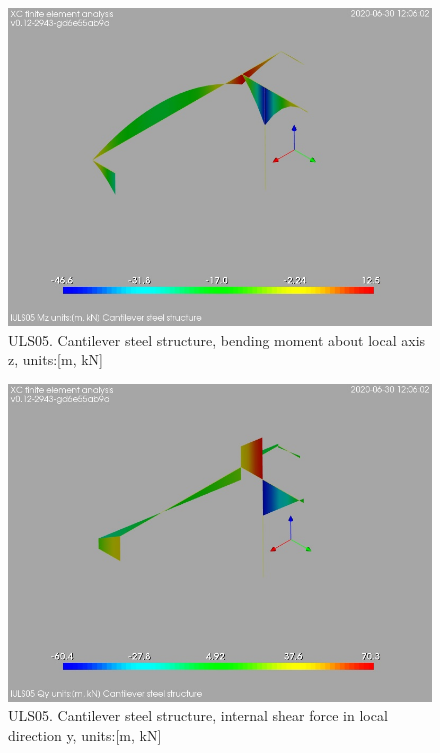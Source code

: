 \begin{figure}
\begin{center}
\includegraphics[width=\linewidth]{ramp_wall/resLC/text/graphics/resSimplLC/lULS05steelMembersMz}
\caption{ULS05. Cantilever steel structure, bending moment about local axis z, units:[m, kN]}
\end{center}
\end{figure}
\begin{figure}
\begin{center}
\includegraphics[width=\linewidth]{ramp_wall/resLC/text/graphics/resSimplLC/lULS05steelMembersQy}
\caption{ULS05. Cantilever steel structure, internal shear force in local direction y, units:[m, kN]}
\end{center}
\end{figure}
